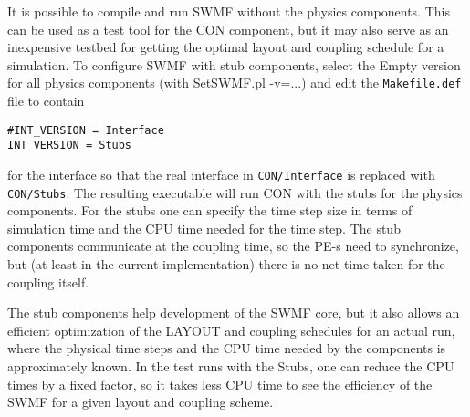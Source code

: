 It is possible to compile and run SWMF without the physics components.
This can be used as a test tool for the CON component, but it may
also serve as an inexpensive testbed for getting the optimal layout
and coupling schedule for a simulation. To configure SWMF with 
stub components, select the Empty version for all physics components
(with SetSWMF.pl -v=...) and edit the {\tt Makefile.def} file to
contain
\begin{verbatim}
#INT_VERSION = Interface
INT_VERSION = Stubs
\end{verbatim}
for the interface so that the real interface in {\tt CON/Interface}
is replaced with {\tt CON/Stubs}.
The resulting executable will run CON with 
the stubs for the physics components. For the stubs one can
specify the time step size in terms of simulation time and the
CPU time needed for the time step. The stub components communicate
at the coupling time, so the PE-s need to synchronize, but 
(at least in the current implementation) there is no net time taken
for the coupling itself. 

The stub components help development of the SWMF core, but it also
allows an efficient optimization of the LAYOUT and coupling
schedules for an actual run, where the physical time steps
and the CPU time needed by the components is approximately known.
In the test runs with the Stubs, one can reduce the CPU times by 
a fixed factor, so it takes less CPU time to see the efficiency of the 
SWMF for a given layout and coupling scheme.

